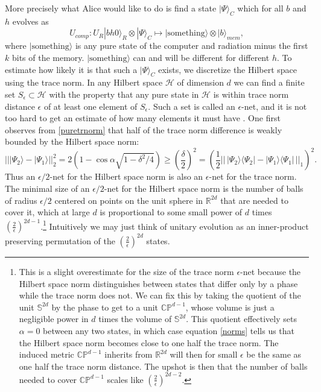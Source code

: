 \documentclass[12pt]{article}
\newcommand{\be}{\begin{equation}}
\newcommand{\ee}{\end{equation}}
\newcommand{\lan}{\langle}
\newcommand{\ran}{\rangle}
\begin{document}
More precisely what Alice would like to do is find a state $|\Psi\ran_{C}$ which for all $b$ and $h$ evolves as
\be \label{comptask}
U_{comp}:U_R|bh0\ran_R\otimes |\Psi\ran_{C}\mapsto|\mathrm{something}\ran\otimes|b\ran_{mem},
\ee
where $|\mathrm{something}\ran$ is any pure state of the computer and radiation minus the first $k$ bits of the memory.  $|\mathrm{something}\ran$ can and will be different for different $h$.  To estimate how likely it is that such a $|\Psi\ran_{C}$ exists, we discretize the Hilbert space using the trace norm.  In any Hilbert space $\mathcal{H}$ of dimension $d$ we can find a finite set $S_\epsilon \subset \mathcal{H}$ with the property that any pure state in $\mathcal{H}$ is within trace norm distance $\epsilon$ of at least one element of $S_\epsilon$.  Such a set is called an $\epsilon$-net, and it is not too hard to get an estimate of how many elements it must have \cite{hayden2004randomizing}.  One first observes from \eqref{puretrnorm} that half of the trace norm difference is weakly bounded by the Hilbert space norm:
\be\label{norms}
|| |\Psi_2\ran-|\Psi_1\ran ||_2^2=2\left(1-\cos \alpha \sqrt{1-\delta^2/4}\right)\geq \left(\frac{\delta}{2}\right)^2=\left(\frac{1}{2}||\,|\Psi_2\ran\lan\Psi_2|-|\Psi_1\ran\lan\Psi_1|\,||_1\right)^2.
\ee
Thus an $\epsilon/2$-net for the Hilbert space norm is also an $\epsilon$-net for the trace norm.  The minimal size of an $\epsilon/2$-net for the Hilbert space norm is the number of balls of radius $\epsilon/2$ centered on points on the unit sphere in $\mathbb{R}^{2d}$ that are needed to cover it, which at large $d$ is proportional to some small power of $d$ times $\left(\frac{2}{\epsilon}\right)^{2d-1}$.\footnote{This is a slight overestimate for the size of the trace norm $\epsilon$-net because the Hilbert space norm distinguishes between states that differ only by a phase while the trace norm does not.  We can fix this by taking the quotient of the unit $\mathbb{S}^{2d}$ by the phase to get to a unit $\mathbb{CP}^{d-1}$, whose volume is just a negligible power in $d$ times the volume of $\mathbb{S}^{2d}$.  This quotient effectively sets $\alpha=0$ between any two states, in which case equation \eqref{norms} tells us that the Hilbert space norm becomes close to one half the trace norm.  The induced metric $\mathbb{CP}^{d-1}$ inherits from $\mathbb{R}^{2d}$ will then for small $\epsilon$ be the same as one half the trace norm distance.  The upshot is then that the number of balls needed to cover $\mathbb{CP}^{d-1}$ scales like $\left(\frac{2}{\epsilon}\right)^{2d-2}$.}  Intuitively we may just think of unitary evolution as an inner-product preserving permutation of the $\left(\frac{2}{\epsilon}\right)^{2d}$ states.  
\end{document}
